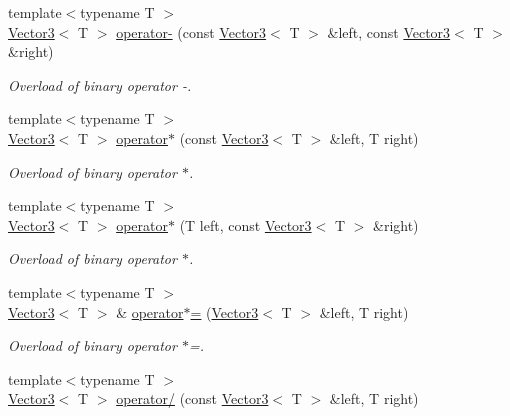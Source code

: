 \begin{DoxyCompactItemize}
{\footnotesize template$<$typename T $>$ }\\\mbox{\hyperlink{classsf_1_1_vector3}{Vector3}}$<$ T $>$ \mbox{\hyperlink{classsf_1_1_vector3_abe0b9411c00cf807bf8a5f835874bd2a}{operator-\/}} (const \mbox{\hyperlink{classsf_1_1_vector3}{Vector3}}$<$ T $>$ \&left, const \mbox{\hyperlink{classsf_1_1_vector3}{Vector3}}$<$ T $>$ \&right)
\begin{DoxyCompactList}\small\item\em Overload of binary operator -\/. \end{DoxyCompactList}\item 
{\footnotesize template$<$typename T $>$ }\\\mbox{\hyperlink{classsf_1_1_vector3}{Vector3}}$<$ T $>$ \mbox{\hyperlink{classsf_1_1_vector3_a44ec312b31c1a85dcff4863795f98329}{operator$\ast$}} (const \mbox{\hyperlink{classsf_1_1_vector3}{Vector3}}$<$ T $>$ \&left, T right)
\begin{DoxyCompactList}\small\item\em Overload of binary operator $\ast$. \end{DoxyCompactList}\item 
{\footnotesize template$<$typename T $>$ }\\\mbox{\hyperlink{classsf_1_1_vector3}{Vector3}}$<$ T $>$ \mbox{\hyperlink{classsf_1_1_vector3_aa6f2b0d9f79c1b9774759b7087affbb1}{operator$\ast$}} (T left, const \mbox{\hyperlink{classsf_1_1_vector3}{Vector3}}$<$ T $>$ \&right)
\begin{DoxyCompactList}\small\item\em Overload of binary operator $\ast$. \end{DoxyCompactList}\item 
{\footnotesize template$<$typename T $>$ }\\\mbox{\hyperlink{classsf_1_1_vector3}{Vector3}}$<$ T $>$ \& \mbox{\hyperlink{classsf_1_1_vector3_ad5fb972775ce8ab58cd9670789e806a7}{operator$\ast$=}} (\mbox{\hyperlink{classsf_1_1_vector3}{Vector3}}$<$ T $>$ \&left, T right)
\begin{DoxyCompactList}\small\item\em Overload of binary operator $\ast$=. \end{DoxyCompactList}\item 
{\footnotesize template$<$typename T $>$ }\\\mbox{\hyperlink{classsf_1_1_vector3}{Vector3}}$<$ T $>$ \mbox{\hyperlink{classsf_1_1_vector3_ad4ba4a83de236ddeb92a7b759187e90d}{operator/}} (const \mbox{\hyperlink{classsf_1_1_vector3}{Vector3}}$<$ T $>$ \&left, T right)

\end{DoxyCompactItemize}
